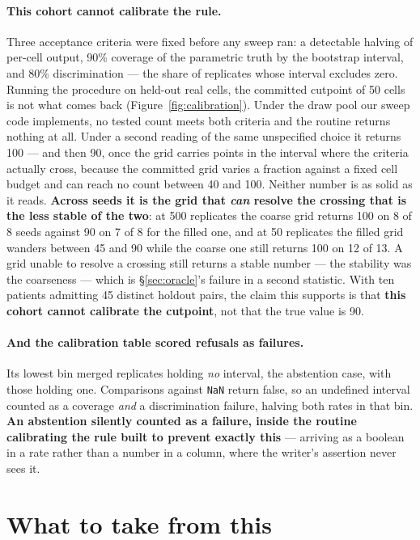 \documentclass{article}
\begin{document}
\paragraph{This cohort cannot calibrate the rule.} Three acceptance criteria were
fixed before any sweep ran: a detectable halving of per-cell output, 90\%
coverage of the parametric truth by the bootstrap interval, and 80\%
discrimination --- the share of replicates whose interval excludes zero. Running the procedure on held-out
real cells, the committed cutpoint of 50 cells is not what comes back
(Figure~\ref{fig:calibration}). Under the draw pool our sweep code implements, no
tested count meets both criteria and the routine returns nothing at all. Under a
second reading of the same unspecified choice it returns 100 --- and then 90,
once the grid carries points in the interval where the criteria actually cross,
because the committed grid varies a fraction against a fixed cell budget and can
reach no count between 40 and 100. Neither number is as solid as it reads.
\textbf{Across seeds it is the grid that \emph{can} resolve the crossing that is
the less stable of the two}: at 500 replicates the coarse grid returns 100 on 8
of 8 seeds against 90 on 7 of 8 for the filled one, and at 50 replicates the
filled grid wanders between 45 and 90 while the coarse one still returns 100 on
12 of 13. A grid unable to resolve a crossing still returns a stable number ---
the stability was the coarseness --- which is \S\ref{sec:oracle}'s failure in a
second statistic. With ten patients admitting 45 distinct holdout pairs, the
claim this supports is that \textbf{this cohort cannot calibrate the cutpoint},
not that the true value is 90.

\paragraph{And the calibration table scored refusals as failures.} Its lowest bin
merged replicates holding \emph{no} interval, the abstention case, with those
holding one. Comparisons against \texttt{NaN} return false, so
an undefined interval counted as a coverage \emph{and} a discrimination failure,
halving both rates in that bin. \textbf{An abstention silently counted as a
failure, inside the routine calibrating the rule built to prevent exactly this}
--- arriving as a boolean in a rate rather than a number in a column, where the
writer's assertion never sees it.

\section{What to take from this}
\label{sec:takeaways}
\end{document}
